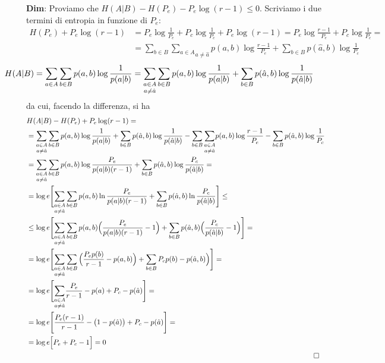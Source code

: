 \begin{tcolorbox}
\textbf{Dim}: Proviamo che $H(A|B) - H(P_e) - P_e \log(r-1) \leq 0$. Scriviamo i due termini di entropia in funzione di $P_e$:
\begin{align*}
    H(P_e) + P_e \log (r-1) &= P_e \log \frac{1}{P_e} + P_c \log \frac{1}{P_c} + P_e \log (r-1) = P_e \log \frac{r-1}{P_e} + P_c \log \frac {1}{P_c} = \\
    &=\sum_{b \in B} \underset{a \neq \hat{a}}{\sum_{a \in A}} p(a,b) \log \frac{r-1}{P_e} + \sum_{b \in B} p(\hat{a},b) \log \frac{1}{P_c}
\end{align*}
\begin{align*}
    \hspace{-30pt}H(A|B) &= \sum_{a \in A} \sum_{b \in B} p(a,b) \info{a|b} = \underset{a \neq \hat{a}}{\sum_{a \in A}} \sum_{b \in B} p(a,b) \info{a|b} + \sum_{b \in B} p(\hat{a},b) \info{\hat{a}|b}
\end{align*}
da cui, facendo la differenza, si ha
\begin{align*}
&H(A|B) - H(P_e) + P_e \log (r-1) = \\
&= \underset{a \neq \hat{a}}{\sum_{a \in A}}\sum_{b\in B} p(a,b) \info{a|b} + \sum_{b \in B} p(\hat{a},b) \info{\hat{a}|b} - \sum_{b \in B} \underset{a \neq \hat{a}}{\sum_{a \in A}}  p(a,b) \log \frac{r-1}{P_e} - \sum_{b \in B} p(\hat{a},b) \log \frac{1}{P_c} \\
&=\underset{a \neq \hat{a}}{\sum_{a \in A}}\sum_{b\in B}  p(a,b) \log \frac{P_e}{p(a|b)(r-1)} + \sum_{b \in B} p(\hat{a},b) \log \frac{P_c}{p(\hat{a}|b)} = \\
&=\log e \Bigg [ \underset{a \neq \hat{a}}{\sum_{a \in A}}\sum_{b\in B}  p(a,b) \ln \frac{P_e}{p(a|b)(r-1)} + \sum_{b \in B} p(\hat{a},b) \ln \frac{P_c}{p(\hat{a}|b)} \Bigg ] \leq \\
&\leq \log e \Bigg [ \underset{a \neq \hat{a}}{\sum_{a \in A}}\sum_{b\in B}  p(a,b) \Big (\frac{P_e}{p(a|b)(r-1)} - 1 \Big ) + \sum_{b \in B} p(\hat{a},b) \Big ( \frac{P_c}{p(\hat{a}|b)} - 1 \Big ) \Bigg ] = \\
&=\log e \Bigg [ \underset{a \neq \hat{a}}{\sum_{a \in A}}\sum_{b\in B} \Big (   \frac{P_e p(b)}{r-1} - p(a,b) \Big ) + \sum_{b \in B} P_c p(b) - p(\hat{a},b) \Big ) \Bigg ] = \\
&=\log e \Bigg [ \underset{a \neq \hat{a}}{\sum_{a \in A}} \frac{P_e}{r-1} - p(a) + P_c - p(\hat{a}) \Bigg ] = \\
&=\log e \Bigg [ \frac{P_e(r-1)}{r-1} - \big (1 - p(\hat{a}) \big ) + P_c - p(\hat{a}) \Bigg ] = \\
&=\log e \Big [ P_e + P_c - 1\Big ] = 0 \\
&\hspace{400pt}\square
\end{align*}
\end{tcolorbox}

